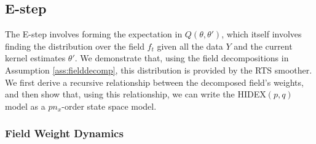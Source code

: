 \documentclass{IEEEtran}
\begin{document}
\subsection{E-step}

The E-step involves forming the expectation in $Q(\theta,\theta')$, which itself involves finding the distribution over the field $f_t$ given all the data $Y$ and the current kernel estimates $\theta'$. We demonstrate that, using the field decompositions in Assumption \ref{ass:fielddecomp}, this distribution is provided by the RTS smoother. We first derive a recursive relationship between the decomposed field's weights, and then show that, using this relationship, we can write the HIDEX$(p,q)$ model as a $pn_x$-order state space model.

\subsubsection{Field Weight Dynamics}
\end{document}
